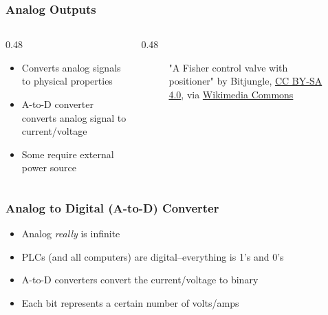 \begin{frame}
    \frametitle{Analog Outputs}

    \begin{columns}
        \begin{column}{0.48\linewidth}
            \begin{itemize}
                \item Converts analog signals to physical properties
                \item A-to-D converter converts analog signal to current/voltage
                \item Some require external power source
            \end{itemize}
        \end{column}
        \begin{column}{0.48\linewidth}
            \begin{figure}
                \centering

                {\tiny "A Fisher control valve with positioner" by Bitjungle, \href{https://creativecommons.org/licenses/by-sa/4.0}{CC BY-SA 4.0}, via \href{https://commons.wikimedia.org/wiki/File:Control_valve_with_positioner.jpg}{Wikimedia Commons}\par}
            \end{figure}            
        \end{column}
    \end{columns}
\end{frame}

\begin{frame}
    \frametitle{Analog to Digital (A-to-D) Converter}

    \begin{itemize}
        \item Analog \emph{really} is infinite
        \item PLCs (and all computers) are digital--everything is 1's and 0's
        \item A-to-D converters convert the current/voltage to binary
        \item Each bit represents a certain number of volts/amps
    \end{itemize}
\end{frame}

